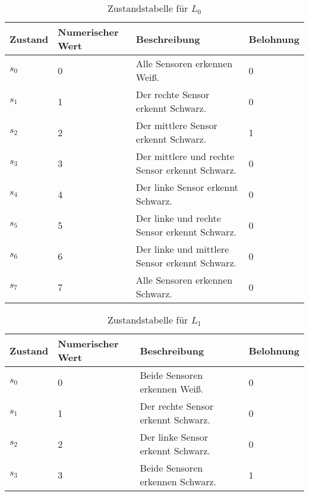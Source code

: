 \begin{table}[H]
  \caption{Zustandstabelle für $L_0$}
  \label{tab:zustaende_drei_sensoren}
  \renewcommand{\arraystretch}{1.2}
  \centering
  \sffamily
  \begin{footnotesize}
    \begin{tabular}{l l l l}
    \toprule
    \textbf{Zustand} & \textbf{Numerischer Wert} & \textbf{Beschreibung} & \textbf{Belohnung}\\
    \midrule
    $s_0$	&	0 & Alle Sensoren erkennen Weiß.	&	0\\ %
    $s_1$	&	1 & Der rechte Sensor erkennt Schwarz.	&	0\\ %
    $s_2$	&	2 & Der mittlere Sensor erkennt Schwarz.	&	1\\ %
    $s_3$	&	3 & Der mittlere und rechte Sensor erkennt Schwarz.	&	0\\ %
    $s_4$	&	4 & Der linke Sensor erkennt Schwarz.	&	0\\ %
    $s_5$	&	5 & Der linke und rechte Sensor erkennt Schwarz.	&	0\\ %
    $s_6$	&	6 & Der linke und mittlere Sensor erkennt Schwarz.	&	0\\ %
    $s_7$	&	7 & Alle Sensoren erkennen Schwarz.	&	0\\ %
    \bottomrule
    \end{tabular}
  \end{footnotesize}
  \rmfamily
\end{table}

\begin{table}[!htbp]
  \caption{Zustandstabelle für $L_1$}
  \label{tab:zustaende_zwei_sensoren}
  \renewcommand{\arraystretch}{1.2}
  \centering
  \sffamily
  \begin{footnotesize}
    \begin{tabular}{l l l l}
    \toprule
    \textbf{Zustand} & \textbf{Numerischer Wert} & \textbf{Beschreibung} & \textbf{Belohnung}\\
    \midrule
    $s_0$	&	0 & Beide Sensoren erkennen Weiß.	&	0\\
    $s_1$	&	1 & Der rechte Sensor erkennt Schwarz.	&	0\\
    $s_2$	&	2 & Der linke Sensor erkennt Schwarz.	&	0\\
    $s_3$	&	3 & Beide Sensoren erkennen Schwarz.	&	1\\
    \bottomrule
    \end{tabular}
  \end{footnotesize}
  \rmfamily
\end{table}

